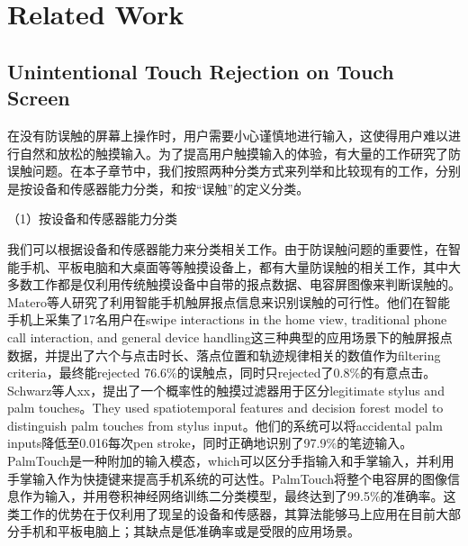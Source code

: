 \section{Related Work}

\subsection{Unintentional Touch Rejection on Touch Screen}

在没有防误触的屏幕上操作时，用户需要小心谨慎地进行输入，这使得用户难以进行自然和放松的触摸输入\cite{2014-PenMightier, 2020-TabletopTouch}。为了提高用户触摸输入的体验，有大量的工作研究了防误触问题。在本子章节中，我们按照两种分类方式来列举和比较现有的工作，分别是按设备和传感器能力分类，和按“误触”的定义分类。

（1）按设备和传感器能力分类

我们可以根据设备和传感器能力来分类相关工作。由于防误触问题的重要性，在智能手机\cite{2012-IdentifyUnint,2015-GestureOn,2018-PalmTouch,2019-BeyondUnint}、平板电脑\cite{2006-PadUnint,2014-PenUnint,2014-PalmRejection,2013-TapBoard,2016-TapBoard2}和大桌面\cite{2020-TabletopTouch}等等触摸设备上，都有大量防误触的相关工作，其中大多数工作都是仅利用传统触摸设备中自带的报点数据\cite{2012-IdentifyUnint,2006-PadUnint,2014-PalmRejection,2013-TapBoard,2016-TapBoard2}、电容屏图像\cite{2018-PalmTouch,2014-PenUnint}来判断误触的。Matero等人研究了利用智能手机触屏报点信息来识别误触的可行性\cite{2012-IdentifyUnint}。他们在智能手机上采集了17名用户在swipe interactions in the home view, traditional phone call interaction, and general device handling这三种典型的应用场景下的触屏报点数据，并提出了六个与点击时长、落点位置和轨迹规律相关的数值作为filtering criteria，最终能rejected 76.6\%的误触点，同时只rejected了0.8\%的有意点击。Schwarz等人xx\cite{2014-PalmRejection}，提出了一个概率性的触摸过滤器用于区分legitimate stylus and palm touches。They used spatiotemporal features and decision forest model to distinguish palm touches from stylus input。他们的系统可以将accidental palm inputs降低至0.016每次pen stroke，同时正确地识别了97.9\%的笔迹输入。PalmTouch\cite{2018-PalmTouch}是一种附加的输入模态，which可以区分手指输入和手掌输入，并利用手掌输入作为快捷键来提高手机系统的可达性。PalmTouch将整个电容屏的图像信息作为输入，并用卷积神经网络训练二分类模型，最终达到了99.5\%的准确率。这类工作的优势在于仅利用了现呈的设备和传感器，其算法能够马上应用在目前大部分手机和平板电脑上；其缺点是低准确率或是受限的应用场景。

